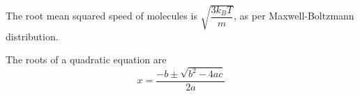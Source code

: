 The root mean squared speed of molecules is $\sqrt{\dfrac{3k_BT}{m}}$, as per Maxwell-Boltzmann distribution.

The roots of a quadratic equation are
\begin{equation}
	x=\frac{-b\pm\sqrt{b^2-4ac}}{2a}
\end{equation}